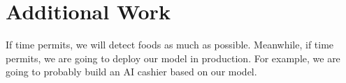 \documentclass{article} %
\begin{document}
\section{Additional Work}

If time permits, we will detect foods as much as possible. Meanwhile, if time permits, we  are going to deploy our model in production. For example, we are going to probably build an AI cashier based on our model.







\end{document}
